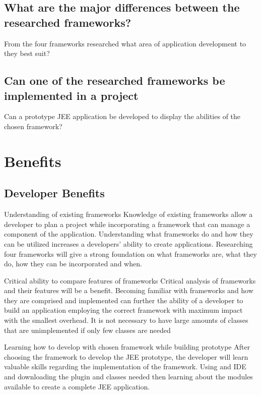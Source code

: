 \subsection{What are the major differences between the researched frameworks?}
From the four frameworks researched what area of application development to they best suit? 
\subsection{Can one of the researched frameworks be implemented in a project}
Can a prototype JEE application be developed to display the abilities of the chosen framework?

\newpage

\section{Benefits}
\subsection{Developer Benefits}
Understanding of existing frameworks\newline
Knowledge of existing frameworks allow a developer to plan a project while incorporating a framework that can manage a component of the application. Understanding what frameworks do and how they can be utilized increases a developers’ ability to create applications. Researching four frameworks will give a strong foundation on what frameworks are, what they do, how they can be incorporated and when. 

Critical ability to compare features of frameworks\newline
Critical analysis of frameworks and their features will be a benefit. Becoming familiar with frameworks and how they are comprised and implemented can further the ability of a developer to build an application employing the correct framework with maximum impact with the smallest overhead. It is not necessary to have large amounts of classes that are unimplemented if only few classes are needed  

Learning how to develop with chosen framework while building prototype\newline
After choosing the framework to develop the JEE prototype, the developer will learn valuable skills regarding the implementation of the framework. Using and IDE and downloading the plugin and classes needed then learning about the modules available to create a complete JEE application.


